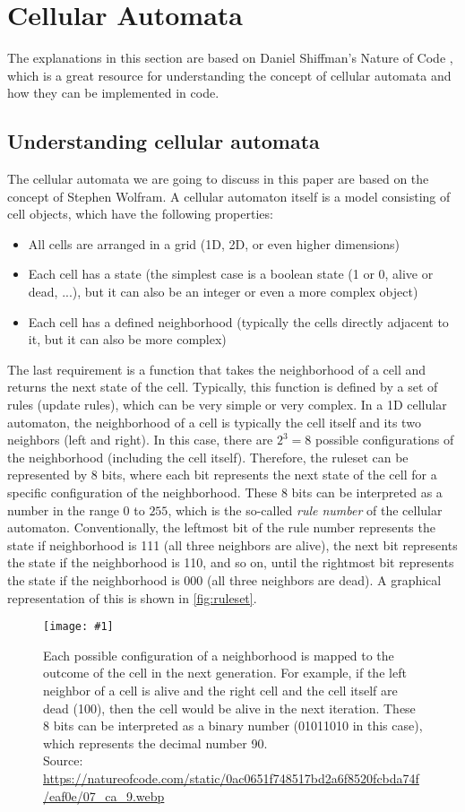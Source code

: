 \documentclass[a4paper,12pt]{llncs}
\numberwithin{equation}{section}
\newcommand{\imagewithwidth}[5]{
  \begin{figure}[htbp]%
    \begin{center}%
      \texttt{[image: \#1]}%
      \caption[#5]{#4}%
      \label{#3}%
    \end{center}%
  \end{figure}
}
\begin{document}
\section{Cellular Automata}
The explanations in this section are based on Daniel Shiffman's Nature of Code \cite{NOC}, which is a great resource for understanding the concept of cellular automata and how they can be implemented in code.
\subsection{Understanding cellular automata}
\label{sec:cellular-automata-understanding}
The cellular automata we are going to discuss in this paper are based on the concept of Stephen Wolfram.
A cellular automaton itself is a model consisting of cell objects, which have the following properties:
\begin{itemize}
  \item All cells are arranged in a grid (1D, 2D, or even higher dimensions)
  \item Each cell has a state (the simplest case is a boolean state (1 or 0, alive or dead, ...), but it can also be an integer or even a more complex object)
  \item Each cell has a defined neighborhood (typically the cells directly adjacent to it, but it can also be more complex)
\end{itemize}
The last requirement is a function that takes the neighborhood of a cell and returns the next state of the cell.
Typically, this function is defined by a set of rules (update rules), which can be very simple or very complex.
In a 1D cellular automaton, the neighborhood of a cell is typically the cell itself and its two neighbors (left and right).
In this case, there are $2^3=8$ possible configurations of the neighborhood (including the cell itself).
Therefore, the ruleset can be represented by 8 bits, where each bit represents the next state of the cell for a specific configuration of the neighborhood.
These 8 bits can be interpreted as a number in the range $0$ to $255$, which is the so-called \textit{rule number} of the cellular automaton.
Conventionally, the leftmost bit of the rule number represents the state if neighborhood is 111 (all three neighbors are alive), the next bit represents the state if the neighborhood is 110, and so on, until the rightmost bit represents the state if the neighborhood is 000 (all three neighbors are dead).
A graphical representation of this is shown in \autoref{fig:ruleset}.
\imagewithwidth{figures/ruleset_example}{0.6\textwidth}{fig:ruleset}{Each possible configuration of a neighborhood is mapped to the outcome of the cell in the next generation. For example, if the left neighbor of a cell is alive and the right cell and the cell itself are dead (100), then the cell would be alive in the next iteration. These 8 bits can be interpreted as a binary number (01011010 in this case), which represents the decimal number 90.\\Source: \url{https://natureofcode.com/static/0ac0651f748517bd2a6f8520fcbda74f/eaf0e/07_ca_9.webp}}{}
\end{document}
